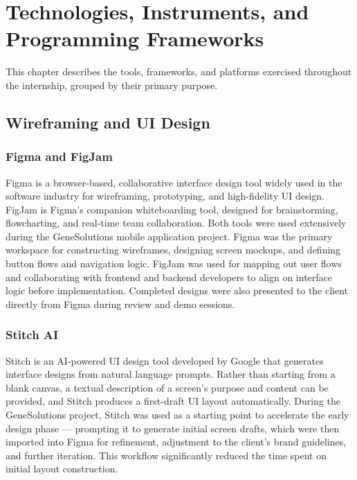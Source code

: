 \chapter{Technologies, Instruments, and Programming Frameworks}
\label{chap:tech}

This chapter describes the tools, frameworks, and platforms exercised throughout the internship, grouped by their primary purpose.

\section{Wireframing and UI Design}

\subsection{Figma and FigJam}

Figma is a browser-based, collaborative interface design tool widely used in the software industry for wireframing, prototyping, and high-fidelity UI design. FigJam is Figma's companion whiteboarding tool, designed for brainstorming, flowcharting, and real-time team collaboration. Both tools were used extensively during the GeneSolutions mobile application project. Figma was the primary workspace for constructing wireframes, designing screen mockups, and defining button flows and navigation logic. FigJam was used for mapping out user flows and collaborating with frontend and backend developers to align on interface logic before implementation. Completed designs were also presented to the client directly from Figma during review and demo sessions.

\subsection{Stitch AI}

Stitch is an AI-powered UI design tool developed by Google that generates interface designs from natural language prompts. Rather than starting from a blank canvas, a textual description of a screen's purpose and content can be provided, and Stitch produces a first-draft UI layout automatically. During the GeneSolutions project, Stitch was used as a starting point to accelerate the early design phase — prompting it to generate initial screen drafts, which were then imported into Figma for refinement, adjustment to the client's brand guidelines, and further iteration. This workflow significantly reduced the time spent on initial layout construction.

